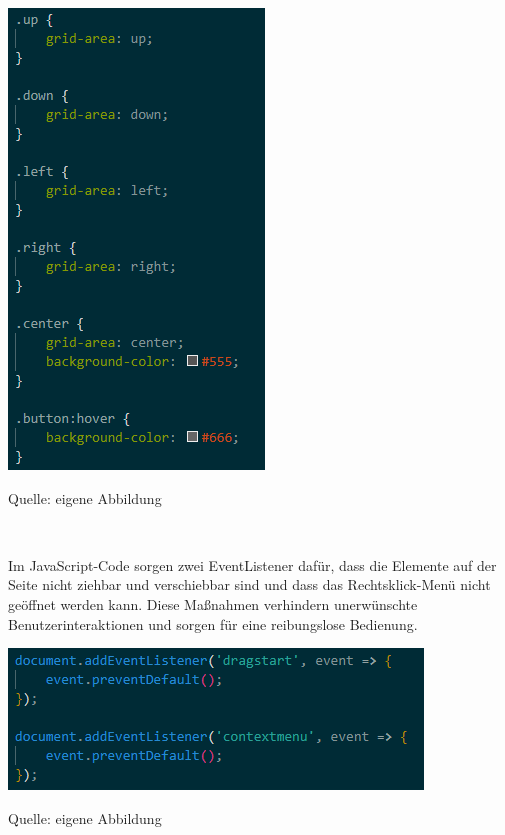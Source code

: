 \documentclass[ngerman,12pt,a4paper]{article}
\begin{document}
	\begin{center}
		\begin{minipage}[t]{0.45\textwidth}
			\includegraphics{Pictures/Steuerung-css2}
			\label{fig:Steuerkreuz-css2}
			\vspace{-10pt}
			\begin{center}
				\par\small Quelle: eigene Abbildung 
			\end{center}
		\end{minipage} \\[0.75cm]
	\end{center}
	Im JavaScript-Code sorgen zwei EventListener dafür, dass die Elemente auf der Seite nicht ziehbar und verschiebbar sind und dass das Rechtsklick-Menü nicht geöffnet werden kann. Diese Maßnahmen verhindern unerwünschte Benutzerinteraktionen und sorgen für eine reibungslose Bedienung. \\[0.5cm]
	\begin{center}
		\begin{minipage}[t]{0.7\textwidth}
			\includegraphics{Pictures/Steuerung-js1}
			\label{fig:Steuerkreuz-js1}
			\vspace{-10pt}
			\begin{center}
				\par\small Quelle: eigene Abbildung 
			\end{center}
		\end{minipage} \\[0.75cm]
	\end{center}
\end{document}
